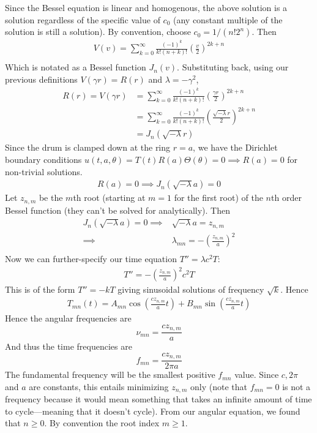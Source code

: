 \documentclass[12pt]{article}
\begin{document}
\begin{enumerate}[(a)]
{Since the Bessel equation is linear and homogenous, the above solution is a solution regardless of the specific value of $c_0$ (any constant multiple of the solution is still a solution). By convention, choose $c_0 = 1/ (n! 2^n)$. Then
\begin{align*}
V(v) = \sum_{k=0}^{\infty} \frac{(-1)^k}{k! (n+k)!}  \left( \frac{v}{2} \right)^{2k + n} \\
\end{align*}
Which is notated as a Bessel function $J_n(v)$. Substituting back, using our previous definitions $V(\gamma r) = R(r)$ and $\lambda = -\gamma^2$,
\begin{align*}
R(r) = V(\gamma r) &= \sum_{k=0}^{\infty} \frac{(-1)^k}{k! (n+k)!}  \left( \frac{\gamma r}{2} \right)^{2k + n} \\
&= \sum_{k=0}^{\infty} \frac{(-1)^k}{k! (n+k)!}  \left( \frac{\sqrt{-\lambda} r}{2} \right)^{2k + n} \\
&= J_n(\sqrt{-\lambda} r)
\end{align*}
Since the drum is clamped down at the ring $r = a$, we have the Dirichlet boundary conditions $u(t,a,\theta) = T(t)R(a)\Theta(\theta) = 0 \implies R(a) = 0$ for non-trivial solutions. \\
\begin{align*}
R(a) = 0 \implies J_n(\sqrt{-\lambda} a) = 0
\end{align*}
Let $z_{n,m}$ be the $m$th root (starting at $m=1$ for the first root) of the $n$th order Bessel function (they can't be solved for analytically). Then
\begin{align*}
J_n(\sqrt{-\lambda} a) = 0 \implies& \sqrt{-\lambda} a = z_{n,m} \\
\implies& \lambda_{mn} = -\left( \frac{z_{n,m}}{a}  \right)^2 \\
\end{align*} 
Now we can further-specify our time equation $T'' = \lambda c^2 T$:
\begin{align*}
T'' = -\left( \frac{z_{n,m}}{a}  \right)^2 c^2 T
\end{align*}
This is of the form $T'' = -kT$ giving sinusoidal solutions of frequency $\sqrt{k}$. Hence
\begin{align*}
T_{mn}(t) = A_{mn} \cos \left( \frac{c z_{n,m}}{a} t  \right) + B_{mn} \sin \left( \frac{c z_{n,m}}{a} t  \right)
\end{align*}
Hence the angular frequencies are 
$$\nu_{mn} = \frac{c z_{n,m}}{a}$$ 
And thus the time frequencies are
$$f_{mn} = \frac{c z_{n,m}}{2\pi a}$$ 
The fundamental frequency will be the smallest positive $f_{mn}$ value. Since $c, 2\pi$ and $a$ are constants, this entails minimizing $z_{n,m}$ only (note that $f_{mn} = 0$ is not a frequency because it would mean something that takes an infinite amount of time to cycle—meaning that it doesn't cycle). From our angular equation, we found that $n \geq 0$. By convention the root index $m \geq 1$. \\ \\ 
}
\end{enumerate}
\end{document}
